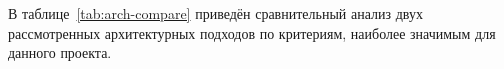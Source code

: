 В таблице~\ref{tab:arch-compare} приведён сравнительный анализ двух рассмотренных архитектурных подходов по критериям, наиболее значимым для данного проекта.



